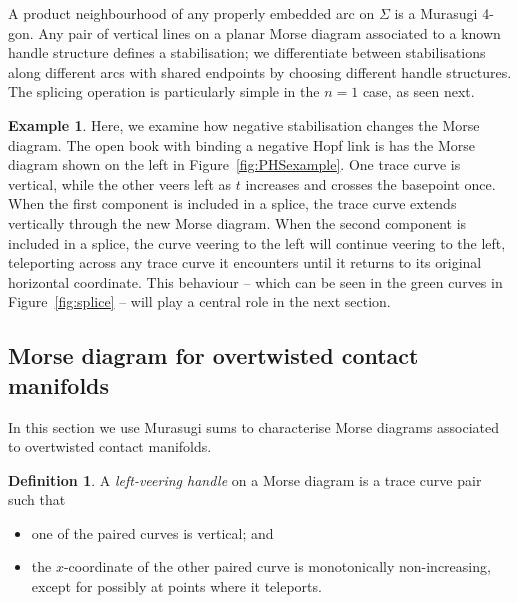 \documentclass{amsart}
\theoremstyle{definition}
\newtheorem{definition}[theorem]{Definition}
\newtheorem{example}[theorem]{Example}
\begin{document}
A product neighbourhood of any properly embedded arc on $\Sigma$ is a Murasugi 4-gon.  Any pair of vertical lines on a planar Morse diagram associated to a known handle structure defines a stabilisation; we differentiate between stabilisations along different arcs with shared endpoints by choosing different handle structures.  The splicing operation is particularly simple in the $n=1$ case, as seen next. 


\begin{example}\label{ex:negstab}
Here, we examine how negative stabilisation changes the Morse diagram.  The open book with binding a negative Hopf link is has the Morse diagram shown on the left in Figure~\ref{fig:PHSexample}.  One trace curve is vertical, while the other veers left as $t$ increases and crosses the basepoint once.  When the first component is included in a splice, the trace curve extends vertically through the new Morse diagram.  When the second component is included in a splice, the curve veering to the left will continue veering to the left, teleporting across any trace curve it encounters until it returns to its original horizontal coordinate.  This behaviour -- which can be seen in the green curves in Figure~\ref{fig:splice} -- will play a central role in the next section.
\end{example}








\subsection{Morse diagram for overtwisted contact manifolds}\label{sec:OT}

In this section we use Murasugi sums to characterise Morse diagrams associated to overtwisted contact manifolds.  

\begin{definition}\label{def:left_veering} A \textit{left-veering handle} on a Morse diagram is a trace curve pair such that 
\begin{itemize}
\item one of the paired curves is vertical; and
\item the $x$-coordinate of the other paired curve is monotonically non-increasing, except for possibly at  points where it teleports. 
\end{itemize}
\end{definition}
\end{document}
